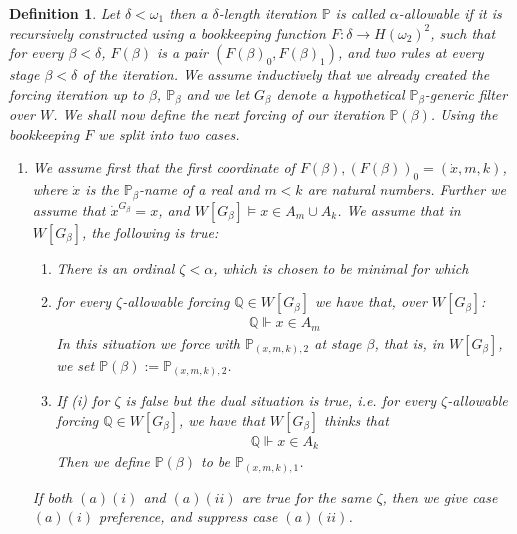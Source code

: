\documentclass[a4paper,11pt]{article}
\newtheorem{definition}[theorem]{Definition}
\newcommand{\forceP}{\mathbb{P}}
\newcommand{\forceQ}{\mathbb{Q}}
\begin{document}
\begin{definition}
Let  $\delta  < \omega_1$ then a $\delta$-length iteration $\forceP$ is called $\alpha$-allowable if it is recursively constructed using a bookkeeping function $F: \delta \rightarrow H(\omega_2)^2$, such that for every $\beta < \delta$, $F(\beta)$ is a pair $(F(\beta)_0, F(\beta)_1)$, and two rules at every stage $\beta < \delta$ of the iteration. We assume inductively that we already created the forcing iteration up to $\beta$, $\forceP_{\beta}$ and we let $G_{\beta}$ denote a hypothetical $\forceP_{\beta}$-generic filter over $W$. We shall now define the next forcing of our iteration $\forceP(\beta)$. Using the bookkeeping $F$ we split into two cases.
\begin{enumerate}
\item[(a)] We assume first that the first coordinate of $F(\beta) ,(F(\beta))_0=(\dot{x},m,k)$, where $\dot{x}$ is the $\forceP_{\beta}$-name of a real and $m<k$ are natural numbers. Further we assume that $\dot{x}^{G_{\beta}}=x$, and $W[G_{\beta}] \models x \in A_m \cup A_k$. 
We assume
 that in $W[G_{\beta}]$, the following is true:
\begin{enumerate}
\item[] There is an ordinal $\zeta < \alpha$, which is chosen to be minimal for which
\item[(i)] for every $\zeta$-allowable forcing $\forceQ \in W[G_{\beta}]$  we have that, over $W[G_{\beta}]$:
\begin{align*}
  \forceQ \Vdash  x \in A_m
\end{align*}
In this situation we force with $\forceP_{(x,m,k),2}$ at stage $\beta$, that is, in $W[G_{\beta}]$, we set $\forceP(\beta):=\forceP_{(x,m,k),2}$.
\item[(ii)] If (i) for $\zeta$ is false but the dual situation is true, i.e.
for every $\zeta$-allowable forcing $\forceQ \in W[G_{\beta}]$, we have that $W[G_{\beta}] $ thinks that
\begin{align*}
  \forceQ \Vdash   x \in A_k
\end{align*}
Then we define $\forceP(\beta)$ to be $\forceP_{(x,m,k),1}$.
\end{enumerate}
If both $(a) (i)$ and $(a) (ii)$ are true for the same $\zeta$, then we give case $(a) (i)$ preference, and suppress case $(a) (ii)$.



\end{enumerate}
\end{definition}
\end{document}
